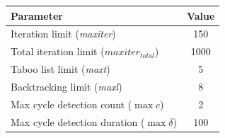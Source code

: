 \documentclass[paper=a4, fontsize=9pt]{scrartcl}
\begin{document}
\begin{multicols}{2}
{
\vspace{0.5cm}
\begin{minipage}{\linewidth{}}
\centering
\begin{tabular}{lc}
\toprule
Parameter                                                 & Value \\
\midrule
Iteration limit (\textit{maxiter})                        &   150 \\
Total iteration limit ($\textit{maxiter}_\textit{total}$) &  1000 \\
Taboo list limit (\textit{maxt})                          &     5 \\
Backtracking limit (\textit{maxl})                        &     8 \\
Max cycle detection count ($\max c$)                      &     2 \\
Max cycle detection duration ($\max \delta$)              &   100 \\
\bottomrule
\end{tabular}
\vspace{-0.2cm}
\label{table:tsparams}
\end{minipage}
}




\end{multicols}

\end{document}
